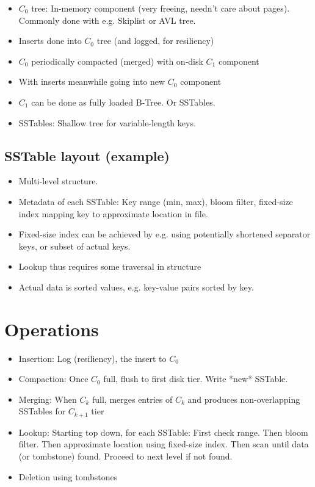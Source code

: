 \documentclass[a4paper]{scrreprt}
\begin{document}
\begin{itemize}
		\item $C_0$ tree: In-memory component (very freeing, needn't care about
				pages). Commonly done with e.g. Skiplist or AVL tree.
		\item Inserts done into $C_0$ tree (and logged, for resiliency)
		\item $C_0$ periodically compacted (merged) with on-disk $C_1$ component
		\item With inserts meanwhile going into new $C_0$ component
		\item $C_1$ can be done as fully loaded B-Tree. Or SSTables.
		\item SSTables: Shallow tree for variable-length keys.
\end{itemize}

\subsection{SSTable layout (example)}

\begin{itemize}
		\item Multi-level structure.
		\item Metadata of each SSTable: Key range (min, max), bloom filter,
				fixed-size index mapping key to approximate location in file.
		\item Fixed-size index can be achieved by e.g. using potentially
				shortened separator keys, or subset of actual keys.
		\item Lookup thus requires some traversal in structure
		\item Actual data is sorted values, e.g. key-value pairs sorted by key.
\end{itemize}

\section{Operations}

\begin{itemize}
		\item Insertion: Log (resiliency), the insert to $C_0$
		\item Compaction: Once $C_0$ full, flush to first disk tier. Write
				*new* SSTable.
		\item Merging: When $C_k$ full, merges entries of $C_k$ and produces
				non-overlapping SSTables for $C_{k+1}$ tier
		\item Lookup: Starting top down, for each SSTable: First check range.
				Then bloom filter. Then approximate location using fixed-size
				index. Then scan until data (or tombstone) found. Proceed to
				next level if not found.
		\item Deletion using tombstones
\end{itemize}
\end{document}

